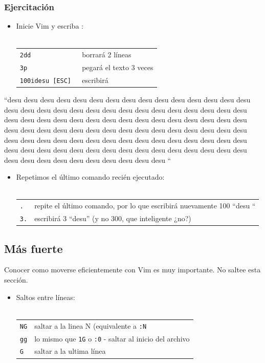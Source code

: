 \documentclass[12pt]{article}
\begin{document}
\subsubsection{Ejercitación}


\begin{itemize}
	\item Inicie Vim y escriba : \\ \\
\begin{tabular}{ l l }
	\texttt{2dd} & borrará 2 líneas \\
	\texttt{3p} & pegará el texto 3 veces \\
	\texttt{100idesu [ESC] } & escribirá \\
\end{tabular}
\end{itemize}
“desu desu desu desu desu desu desu desu desu desu desu desu desu desu desu desu desu desu desu desu desu desu desu desu desu desu desu desu desu desu desu desu desu desu desu desu desu desu desu desu desu desu desu desu desu desu desu desu desu desu desu desu desu desu desu desu desu desu desu desu desu desu desu desu desu desu desu desu desu desu desu desu desu desu desu desu desu desu desu desu desu desu desu desu desu desu desu desu desu desu desu desu desu desu desu desu desu desu desu desu “
\begin{itemize}
	\item Repetimos el último comando recién ejecutado: \\ \\
\begin{tabular}{ l l }
	\texttt{.} & repite el último comando, por lo que escribirá nuevamente 100 “desu “ \\
	\texttt{3.} & escribirá 3 “desu” (y no 300, que inteligente ¿no?) \\
\end{tabular}
\end{itemize}



\subsection{Más fuerte}

Conocer como moverse eficientemente con Vim es muy importante. No saltee esta
sección.

\begin{itemize}
	\item Saltos entre líneas:  \\ \\
\begin{tabular}{ l l }
	\texttt{NG} & saltar a la linea N (equivalente a \texttt{:N}\\
	\texttt{gg} & lo mismo que \texttt{1G} o \texttt{:0} - saltar al inicio del archivo \\
	\texttt{G} & saltar a la ultima línea \\
\end{tabular}
\end{itemize}
\end{document}

